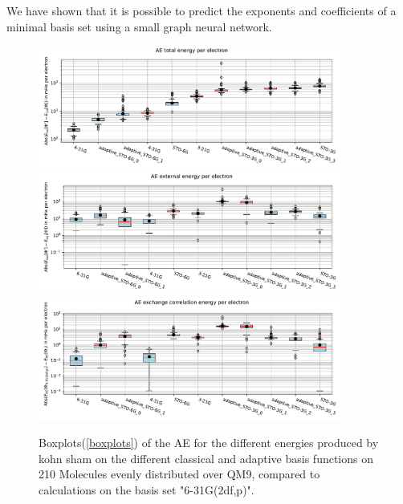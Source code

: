 We have shown that it is possible to predict the exponents and coefficients of a minimal basis set using a small graph neural network.



\begin{figure}
    \centering
    \includegraphics[width=0.9\textwidth]{chapters/results/results_images/adaptive_basis_functions/total_energy_adaptive_basis_sets}
    \includegraphics[width=0.9\textwidth]{chapters/results/results_images/adaptive_basis_functions/coulomb_energy_adaptive_basis_sets}
    \includegraphics[width=0.9\textwidth]{chapters/results/results_images/adaptive_basis_functions/exchange_correlation_energy_adaptive_basis_sets}
    \caption{Boxplots(\ref{boxplots}) of the AE for the different energies produced by kohn sham on the different classical and adaptive basis functions on 210 Molecules evenly distributed over QM9, compared to calculations on the basis set "6-31G(2df,p)".} \label{fig:AE_energies_adaptive_basis_sets}
\end{figure}




